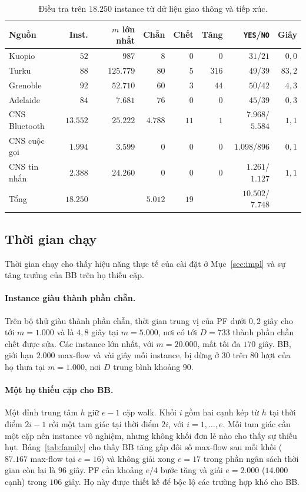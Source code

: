 \documentclass[pdflatex,sn-mathphys-num]{sn-jnl}
\theoremstyle{thmstyleone}%
\theoremstyle{thmstyletwo}%
\theoremstyle{thmstylethree}%
\newcommand{\YES}{\texttt{YES}}
\newcommand{\NO}{\texttt{NO}}
\begin{document}
\begin{table}[t]
\caption{Điều tra trên $18.250$ instance từ dữ liệu giao thông và tiếp xúc.}
\label{tab:census}
\begin{tabular*}{\textwidth}{@{\extracolsep\fill}lrrrrrrr}
\toprule
Nguồn & Inst. & $m$ lớn nhất & Chẵn & Chết & Tăng & \YES{}/\NO{} & Giây \\
\midrule
Kuopio & $52$ & $987$ & $8$ & $0$ & $0$ & $31$/$21$ & $0{,}0$ \\
Turku & $88$ & $125.779$ & $80$ & $5$ & $316$ & $49$/$39$ & $83{,}2$ \\
Grenoble & $92$ & $52.710$ & $60$ & $3$ & $44$ & $50$/$42$ & $4{,}3$ \\
Adelaide & $84$ & $7.681$ & $76$ & $0$ & $0$ & $45$/$39$ & $0{,}3$ \\
CNS Bluetooth & $13.552$ & $25.222$ & $4.788$ & $11$ & $1$ & $7.968$/$5.584$ & $1{,}1$ \\
CNS cuộc gọi & $1.994$ & $3.599$ & $0$ & $0$ & $0$ & $1.098$/$896$ & $0{,}1$ \\
CNS tin nhắn & $2.388$ & $24.260$ & $0$ & $0$ & $0$ & $1.261$/$1.127$ & $1{,}1$ \\
\midrule
Tổng & $18.250$ & & $5.012$ & $19$ & & $10.502$/$7.748$ & \\
\bottomrule
\end{tabular*}
\end{table}

\subsection{Thời gian chạy}\label{sec:exp-scale}

Thời gian chạy cho thấy hiệu năng thực tế của cài đặt ở Mục~\ref{sec:impl} và sự tăng trưởng của BB trên họ thiếu cặp.

\paragraph{Instance giàu thành phần chẵn.} Trên bộ thử giàu thành phần chẵn, thời gian trung vị của PF dưới $0{,}2$ giây cho tới $m=1.000$ và là $4{,}8$ giây tại $m=5.000$, nơi có tới $D=733$ thành phần chẵn chết được sửa. Các instance lớn nhất, với $m=20.000$, mất tối đa $170$ giây. BB, giới hạn $2.000$ max-flow và vài giây mỗi instance, bị dừng ở $30$ trên $80$ lượt của họ thưa tại $m=1.000$, nơi $D$ trung bình khoảng $90$.

\paragraph{Một họ thiếu cặp cho BB.} Một đỉnh trung tâm $h$ giữ $e-1$ cặp walk. Khối $i$ gồm hai cạnh kép từ $h$ tại thời điểm $2i-1$ rồi một tam giác tại thời điểm $2i$, với $i=1,\dots,e$. Mỗi tam giác cần một cặp nên instance vô nghiệm, nhưng không khối đơn lẻ nào cho thấy sự thiếu hụt. Bảng~\ref{tab:family} cho thấy BB tăng gấp đôi số max-flow sau mỗi khối ($87.167$ max-flow tại $e=16$) và không giải xong $e=17$ trong phần ngân sách thời gian còn lại là $96$ giây. PF cần khoảng $e/4$ bước tăng và giải $e=2.000$ ($14.000$ cạnh) trong $106$ giây. Họ này được thiết kế để bộc lộ các trường hợp khó cho BB.
\end{document}
